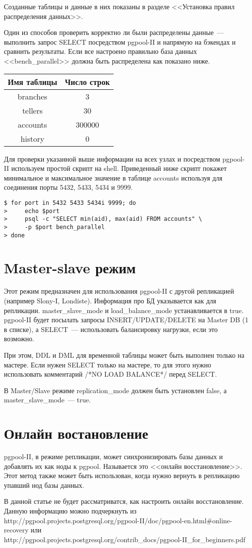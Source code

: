 Созданные таблицы и данные в них показаны в разделе <<Установка правил распределения данных>>.

Один из способов проверить корректно ли были распределены данные~--- выполнить запрос SELECT посредством 
pgpool-II и напрямую на бэкендах и сравнить результаты. Если все настроено правильно база данных 
<<bench\_parallel>> должна быть распределена как показано ниже.

\begin{tabular}{ | c | c | }
  \hline
  Имя таблицы & Число строк \\
  \hline
  branches & 3 \\
  \hline
  tellers & 30 \\
  \hline
  accounts & 300000 \\
  \hline
  history & 0 \\
  \hline
\end{tabular}

Для проверки указанной выше информации на всех узлах и посредством pgpool-II используем простой скрипт на shell. 
Приведенный ниже скрипт покажет минимальное и максимальное значение в таблице accounts используя для соединения 
порты 5432, 5433, 5434 и 9999.
\begin{verbatim}
$ for port in 5432 5433 5434i 9999; do
>     echo $port
>     psql -c "SELECT min(aid), max(aid) FROM accounts" \
>     -p $port bench_parallel
> done
\end{verbatim}


\section{Master-slave режим}
Этот режим предназначен для использования pgpool-II с другой репликацией (например Slony-I, Londiste). 
Информация про БД указывается как для репликации. master\_slave\_mode и load\_balance\_mode устанавливается в true. 
pgpool-II будет посылать запросы INSERT/UPDATE/DELETE на Master DB (1 в списке), а SELECT~--- использовать балансировку 
нагрузки, если это возможно.

При этом, DDL и DML для временной таблицы может быть выполнен только на мастере. Если нужен SELECT только на мастере, то для этого 
нужно использовать комментарий /*NO LOAD BALANCE*/ перед SELECT.

В Master/Slave режиме replication\_mode должен быть установлен false, а master\_slave\_mode~--- true.

\section{Онлайн востановление}
pgpool-II, в режиме репликации, может синхронизировать базы данных и добавлять их как ноды к pgpool. 
Называется это <<онлайн восстановление>>. Этот метод также может быть использован, когда нужно вернуть 
в репликацию упавший нод базы данных.

В данной статье не будет рассматриватся, как настроить онлайн восстановление. Данную информацию можно подчеркнуть из \\
http://pgpool.projects.postgresql.org/pgpool-II/doc/pgpool-en.html\#online-recovery или \\
http://pgpool.projects.postgresql.org/contrib\_docs/pgpool-II\_for\_beginners.pdf




